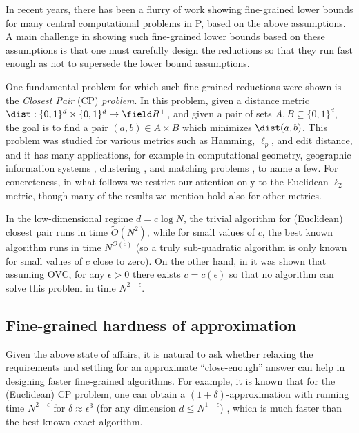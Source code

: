 \documentclass[11pt]{article}
\begin{document}
In recent years, there has been a flurry of work showing fine-grained lower bounds for many central computational problems in P, based on the above assumptions.  A main challenge in showing such fine-grained lower bounds based on these assumptions  is that one must carefully design the reductions so that they run fast enough as not to supersede the lower bound assumptions. 

One fundamental problem for which such fine-grained reductions were shown is the
\emph{Closest Pair}  (CP) \emph{problem}. In this problem, given a distance metric $\dist: \{0,1\}^d \times \{0,1\}^d \to \field R^+$, and given a pair of sets $A,B\subseteq\{0,1\}^{d}$, the goal is to find a pair $(a,b)\in A\times B$ which minimizes $\dist(a,b)$. 
This problem was studied for various metrics such as Hamming, $\ell_{p}$, and edit distance, and it has many applications, for example in computational geometry, geographic
information systems \cite{Hen06}, clustering \cite{Zah71,Alp10},
and matching problems \cite{WTFX07}, to name a few.
For concreteness, in what follows we restrict our attention only to the Euclidean $\ell_2$ metric, though many of the results we mention hold also for other metrics. 

In the low-dimensional regime $d = c \log N$, the trivial algorithm for (Euclidean) closest pair runs in time $\tilde O(N^2)$, while for small values of $c$,
the best known algorithm  runs in time $N^{O(c)}$
\cite{Rabin76, KM95} (so a truly sub-quadratic algorithm is only known for small values of $c$ close to zero).
  On the other hand, in \cite{AW15} it was shown that assuming OVC, for any $\epsilon>0$ there exists $c = c(\epsilon)$ so that
no algorithm can solve this problem in time $N^{2-\epsilon}$.

\subsection{Fine-grained hardness of approximation}

Given the above state of affairs, it is natural to ask whether relaxing the requirements and settling  
for an approximate ``close-enough'' answer can help in designing faster fine-grained algorithms. For example, it is known that for the (Euclidean) CP problem, one can obtain a $(1+\delta)$-approximation with running time $N^{2-\epsilon}$ for $\delta \approx \epsilon^3$ (for any dimension $d \leq N^{1-\epsilon}$) \cite{ACW16}, which is much faster than the best-known exact algorithm.
\end{document}
